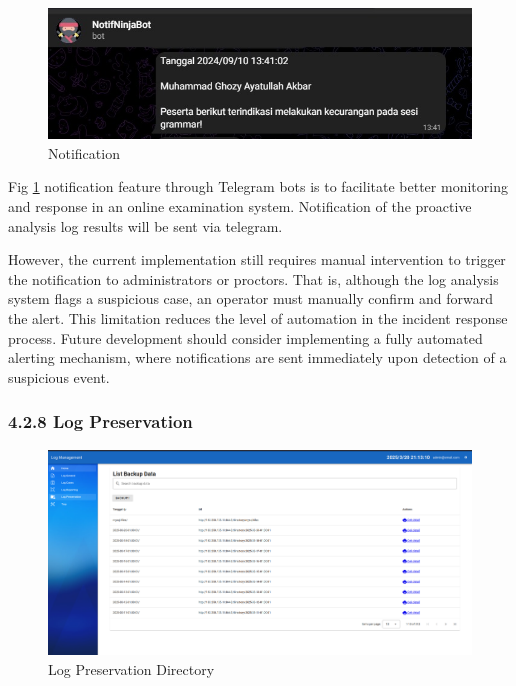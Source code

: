\begin{figure}[H] 
	\centering
	\includegraphics[width=14cm]{figure/log-notification.jpeg}
	\caption{Notification}
	\label{fig:telegram-notification}
\end{figure}

Fig \ref{fig:telegram-notification} notification feature through Telegram bots is to facilitate better monitoring and response in an online examination system. Notification of the proactive analysis log results will be sent via telegram. 

However, the current implementation still requires manual intervention to trigger the notification to administrators or proctors. That is, although the log analysis system flags a suspicious case, an operator must manually confirm and forward the alert. This limitation reduces the level of automation in the incident response process. Future development should consider implementing a fully automated alerting mechanism, where notifications are sent immediately upon detection of a suspicious event.
\subsubsection{4.2.8 Log Preservation}
\begin{figure}[H] 
	\centering
	\includegraphics[width=18cm]{figure/log_preservation.png}
	\caption{Log Preservation Directory}
	\label{fig:log-preservation-1}
\end{figure}

